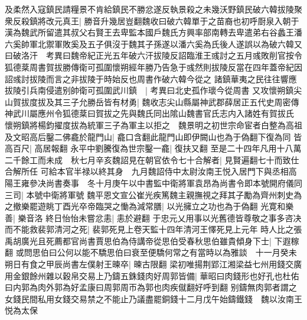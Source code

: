 及柔然入寇鎮民請糧景不肯給鎮民不勝忿遂反執景殺之未幾沃野鎮民破六韓拔陵聚衆反殺鎮將改元真王|{
	勝音升幾居豈翻魏收曰破六韓單于之苗裔也初呼㕑泉入朝于漢為魏武所留遣其叔父右賢王去卑監本國戶魏氏方興率部南轉去卑遣弟右谷蠡王潘六奚帥軍北禦軍敗奚及五子俱沒于魏其子孫遂以潘六奚為氏後人遂誤以為破六韓又曰破洛汗　考異曰魏帝紀正光五年破六汗拔陵反詔臨淮王彧討之五月彧敗削官按令狐德棻周書賀拔勝傳衛可孤圍懷朔經年勝乃告急于彧然則拔陵反當在四年蓋帝紀因詔彧討拔陵而言之非拔陵于時始反也周書作破六韓今從之}
諸鎮華夷之民往往響應拔陵引兵南侵遣别帥衛可孤圍武川鎮　|{
	考異曰北史孤作瓌今從周書}
又攻懷朔鎮尖山賀拔度拔及其三子允勝岳皆有材勇|{
	魏收志尖山縣屬神武郡薛居正五代史周密傳神武川屬應州令狐德棻曰賀拔之先與魏氏同出隂山魏書官氏志内入諸姓有賀拔氏}
懷朔鎮將楊鈞擢度拔為統軍三子為軍主以拒之　魏景明之初世宗命宦者白整為高祖及文昭高后鑿二佛龕於龍門山|{
	龕口含翻此龍門山即伊闕山也為于偽翻下復為同}
皆高百尺|{
	高居報翻}
永平中劉騰復為世宗鑿一龕|{
	復扶又翻}
至是二十四年凡用十八萬二千餘工而未成　秋七月辛亥魏詔見在朝官依令七十合解者|{
	見賢遍翻七十而致仕合解所任}
可給本官半禄以終其身　九月魏詔侍中太尉汝南王悦入居門下與丞相高陽王雍參决尚書奏事　冬十月庚午以中書監中衛將軍袁昂為尚書令即本號開府儀同三司|{
	本號中衛將軍號}
魏平恩文宣公崔光疾篤魏主親撫視之拜其子勵為齊州刺史為之撤樂罷遊眺丁酉光卒帝臨哭之慟為減常膳|{
	以光擁立之功也為于偽翻}
光寛和樂善|{
	樂音洛}
終日怡怡未嘗忿恚|{
	恚於避翻}
于忠元乂用事以光舊德皆尊敬之事多咨决而不能救裴郭清河之死|{
	裴郭死見上卷天監十四年清河王懌死見上元年}
時人比之張禹胡廣光且死薦都官尚書賈思伯為侍講帝從思伯受春秋思伯雖貴傾身下士|{
	下遐稼翻}
或問思伯曰公何以能不驕思伯曰衰至便驕何常之有當時以為雅談　十一月癸未朔日有食之甲辰尚書左僕射王暕卒|{
	暕古限翻}
梁初唯揚荆郢江湘梁益七州用錢交廣用金銀餘州雜以穀帛交易上乃鑄五銖錢肉好周郭皆備|{
	華昭曰肉錢形也好孔也杜佑曰内郭為肉外郭為好孟康曰周郭周帀為郭也肉疾僦翻好呼到翻}
别鑄無肉郭者謂之女錢民間私用女錢交易禁之不能止乃議盡罷銅錢十二月戊午始鑄鐵錢　魏以汝南王悦為太保

